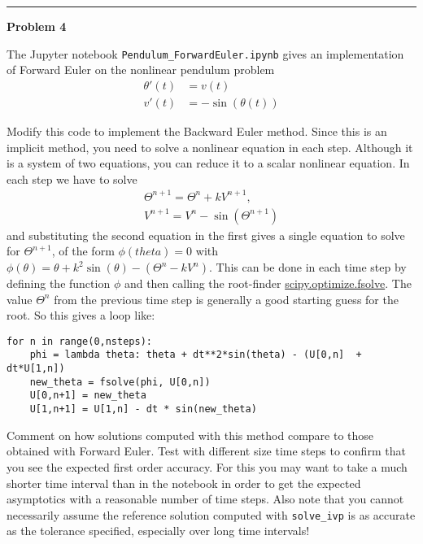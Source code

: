 \documentclass[10pt]{article}
\begin{document}




\hrule
{\bf Problem 4}

The Jupyter notebook {\tt Pendulum\_ForwardEuler.ipynb} gives an implementation of Forward Euler on the nonlinear pendulum problem
\begin{align}
\theta'(t) &= v(t)\\
v'(t) &= -\sin(\theta(t))
\end{align}

Modify this code to implement the Backward Euler method.  Since this is an 
implicit method, you need to solve a nonlinear equation in each step.  
Although it is a system of two equations, you can reduce it to a scalar
nonlinear equation.  In each step we have to solve
\begin{align}
\Theta^{n+1} = \Theta^n + kV^{n+1},\\
V^{n+1} = V^n - \sin(\Theta^{n+1})
\end{align}
and substituting the second equation in the first gives a single equation to 
solve for $\Theta^{n+1}$, of the form $\phi(theta) = 0$ with
$\phi(\theta) = \theta + k^2\sin(\theta) - (\Theta^n - kV^n)$.
This can be done in each time step by defining the function $\phi$ and then
calling the root-finder 
\href{https://docs.scipy.org/doc/scipy/reference/generated/scipy.optimize.fsolve.html}{scipy.optimize.fsolve}.
The value $\Theta^n$ from the previous 
time step is generally a good starting guess for the root. So this gives
a loop like:

\begin{verbatim}
for n in range(0,nsteps):
    phi = lambda theta: theta + dt**2*sin(theta) - (U[0,n]  + dt*U[1,n])
    new_theta = fsolve(phi, U[0,n])
    U[0,n+1] = new_theta
    U[1,n+1] = U[1,n] - dt * sin(new_theta)
\end{verbatim}

Comment on how solutions computed with this method compare to 
those obtained with Forward Euler.  Test with different size time steps
to confirm that you see the expected first order accuracy.
For this you may want to take a much shorter time interval than in the
notebook in order to get the expected asymptotics with a reasonable number
of time steps.  Also note that you cannot necessarily assume the 
reference solution computed with {\tt solve\_ivp} is as accurate as the
tolerance specified, especially over long time intervals!
\end{document}
